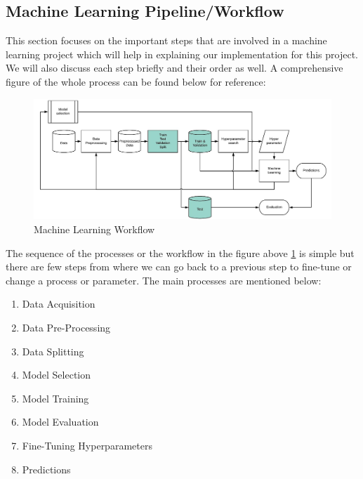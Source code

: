 \subsection{Machine Learning Pipeline/Workflow}
This section focuses on the important steps that are involved in a machine learning project which will help in explaining our implementation for this project. We will also discuss each step briefly and their order as well. A comprehensive figure of the whole process can be found below for reference:

\begin{figure}[H]
\centering
\includegraphics[scale=0.3]{images/Chapter2/ml-pipeline.jpg}
\caption{Machine Learning Workflow \cite{ml-pipeline}}
\label{ml-pipeline}
\end{figure}
\par
The sequence of the processes or the workflow in the figure above \ref{ml-pipeline} is simple but there are few steps from where we can go back to a previous step to fine-tune or change a process or parameter. The main processes are mentioned below:
\newline
\begin{enumerate}
  \item  Data Acquisition
  \item  Data Pre-Processing
  \item  Data Splitting
  \item  Model Selection
  \item  Model Training
  \item  Model Evaluation
  \item  Fine-Tuning Hyperparameters
  \item  Predictions
\end{enumerate}
